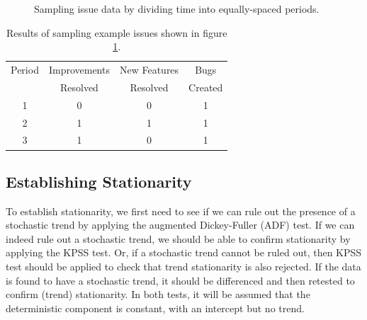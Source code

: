 \documentclass[letterpaper]{report}
\begin{document}
\begin{figure}[htbp]
\begin{center}
\caption[Sampling issue data]{Sampling issue data by dividing time into equally-spaced periods.}
\label{fig:sampling_issue_data}
\end{center}
\end{figure}

\begin{table}[htbp]
\caption[Sampling issue data]{Results of sampling example issues shown in figure \ref{fig:sampling_issue_data}.}
\centering
\begin{tabular}{ c | c | c | c }
\hline
Period & Improvements & New Features & Bugs \\
~& Resolved & Resolved & Created \\
\hline
1 & 0 & 0 & 1 \\
2 & 1 & 1 & 1 \\
3 & 1 & 0 & 1 \\
\hline
\end{tabular}
\label{tab:sampling_issue_data}
\end{table}

\subsection*{Establishing Stationarity}
To establish stationarity, we first need to see if we can rule out the presence of a stochastic trend by applying the augmented Dickey-Fuller (ADF) test. If we can indeed rule out a stochastic trend, we should be able to confirm stationarity by applying the KPSS test. Or, if a stochastic trend cannot be ruled out, then KPSS test should be applied to check that trend stationarity is also rejected. If the data is found to have a stochastic trend, it should be differenced and then retested to confirm (trend) stationarity. In both tests, it will be assumed that the deterministic component is constant, with an intercept but no trend.
\end{document}
